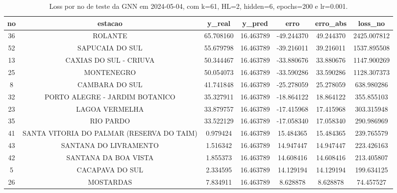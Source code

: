 \begin{table}[h]
\centering
\caption{Loss por no de teste da GNN em 2024-05-04, com k=61, HL=2, hidden=6, epochs=200 e lr=0.001.}
\label{tab:gnn_loss_k61_hl2_h6_e200_d20240504}
\begin{tabular}{ccccccc}
\toprule
no & estacao & y\_real & y\_pred & erro & erro\_abs & loss\_no \\
\midrule
36 & ROLANTE & 65.708160 & 16.463789 & -49.244370 & 49.244370 & 2425.007812 \\
52 & SAPUCAIA DO SUL & 55.679798 & 16.463789 & -39.216011 & 39.216011 & 1537.895508 \\
13 & CAXIAS DO SUL - CRIUVA & 50.344467 & 16.463789 & -33.880676 & 33.880676 & 1147.900269 \\
25 & MONTENEGRO & 50.054073 & 16.463789 & -33.590286 & 33.590286 & 1128.307373 \\
8 & CAMBARA DO SUL & 41.741848 & 16.463789 & -25.278059 & 25.278059 & 638.980286 \\
32 & PORTO ALEGRE - JARDIM BOTANICO & 35.327911 & 16.463789 & -18.864122 & 18.864122 & 355.855103 \\
23 & LAGOA VERMELHA & 33.879757 & 16.463789 & -17.415968 & 17.415968 & 303.315948 \\
35 & RIO PARDO & 33.522129 & 16.463789 & -17.058340 & 17.058340 & 290.986969 \\
41 & SANTA VITORIA DO PALMAR (RESERVA DO TAIM) & 0.979424 & 16.463789 & 15.484365 & 15.484365 & 239.765579 \\
43 & SANTANA DO LIVRAMENTO & 1.516342 & 16.463789 & 14.947447 & 14.947447 & 223.426163 \\
42 & SANTANA DA BOA VISTA & 1.855373 & 16.463789 & 14.608416 & 14.608416 & 213.405807 \\
5 & CACAPAVA DO SUL & 2.334595 & 16.463789 & 14.129194 & 14.129194 & 199.634125 \\
26 & MOSTARDAS & 7.834911 & 16.463789 & 8.628878 & 8.628878 & 74.457527 \\
\bottomrule
\end{tabular}
\end{table}
